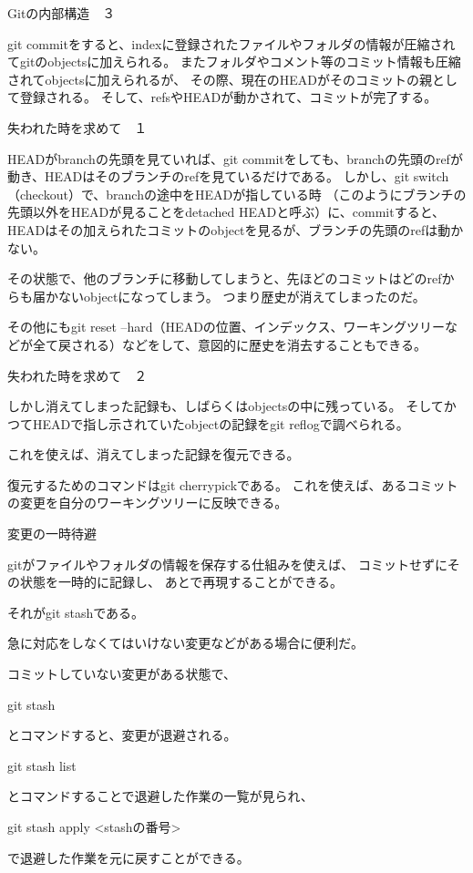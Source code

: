 \documentclass[12pt, unicode]{beamer}
\begin{document}
\begin{frame}{Gitの内部構造　３}

git commitをすると、indexに登録されたファイルやフォルダの情報が圧縮されてgitのobjectsに加えられる。
またフォルダやコメント等のコミット情報も圧縮されてobjectsに加えられるが、
その際、現在のHEADがそのコミットの親として登録される。
そして、refsやHEADが動かされて、コミットが完了する。

\end{frame}
\begin{frame}{失われた時を求めて　１}

HEADがbranchの先頭を見ていれば、git commitをしても、branchの先頭のrefが動き、HEADはそのブランチのrefを見ているだけである。
しかし、git switch（checkout）で、branchの途中をHEADが指している時
（このようにブランチの先頭以外をHEADが見ることをdetached HEADと呼ぶ）に、commitすると、
HEADはその加えられたコミットのobjectを見るが、ブランチの先頭のrefは動かない。

その状態で、他のブランチに移動してしまうと、先ほどのコミットはどのrefからも届かないobjectになってしまう。
つまり歴史が消えてしまったのだ。

その他にもgit reset --hard（HEADの位置、インデックス、ワーキングツリーなどが全て戻される）などをして、意図的に歴史を消去することもできる。

\end{frame}
\begin{frame}{失われた時を求めて　２}

しかし消えてしまった記録も、しばらくはobjectsの中に残っている。
そしてかつてHEADで指し示されていたobjectの記録をgit reflogで調べられる。

これを使えば、消えてしまった記録を復元できる。

復元するためのコマンドはgit cherrypickである。
これを使えば、あるコミットの変更を自分のワーキングツリーに反映できる。

\end{frame}
\begin{frame}{変更の一時待避}

gitがファイルやフォルダの情報を保存する仕組みを使えば、
コミットせずにその状態を一時的に記録し、
あとで再現することができる。

それがgit stashである。

急に対応をしなくてはいけない変更などがある場合に便利だ。

コミットしていない変更がある状態で、

git stash

とコマンドすると、変更が退避される。

git stash list

とコマンドすることで退避した作業の一覧が見られ、

git stash apply <stashの番号>

で退避した作業を元に戻すことができる。

\end{frame}
\end{document}
